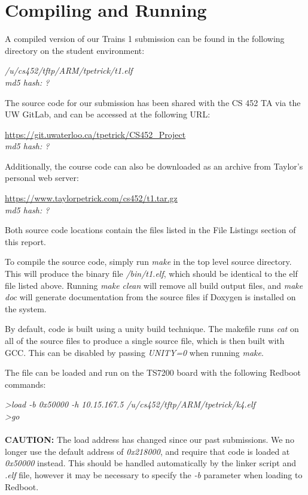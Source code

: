 \documentclass[twoside,a4paper]{refart}
\begin{document}
\section{Compiling and Running}
A compiled version of our Trains 1 submission can be found in the following directory on the student environment:
\begin{center}
\textit{/u/cs452/tftp/ARM/tpetrick/t1.elf}\\
\textit{md5 hash: ?}
\end{center}
The source code for our submission has been shared with the CS 452 TA via the UW GitLab, and can be accessed at the following URL:
\begin{center}
\url{https://git.uwaterloo.ca/tpetrick/CS452_Project}\\
\textit{md5 hash: ?}
\end{center}
Additionally, the course code can also be downloaded as an archive from Taylor’s personal web server:
\begin{center}
\url{https://www.taylorpetrick.com/cs452/t1.tar.gz}\\
\textit{md5 hash: ?}
\end{center}
Both source code locations contain the files listed in the File Listings section of this report.

To compile the source code, simply run \textit{make} in the top level source directory. This will produce the binary file \textit{/bin/t1.elf}, which should be identical to the elf file listed above. Running \textit{make clean} will remove all build output files, and \textit{make doc} will generate documentation from the source files if Doxygen is installed on the system.

By default, code is built using a unity build technique. The makefile runs \textit{cat} on all of the source files to produce a single source file, which is then built with GCC. This can be disabled by passing \textit{UNITY=0} when running \textit{make}.

The file can be loaded and run on the TS7200 board with the following Redboot commands:

\textit{\textgreater load -b 0x50000 -h 10.15.167.5 /u/cs452/tftp/ARM/tpetrick/k4.elf}\\
\textit{\textgreater go}\\\\

\textbf{CAUTION:}  The load address has changed since our past submissions. We no longer use the default address of \textit{0x218000}, and require that code is loaded at \textit{0x50000} instead. This should be handled automatically by the linker script and \textit{.elf} file, however it may be necessary to specify the \textit{-b} parameter when loading to Redboot.
\end{document}

